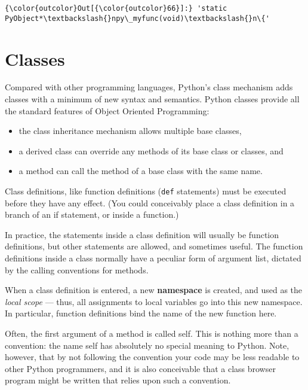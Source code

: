 \documentclass{article}
\begin{document}
            \begin{Verbatim}[commandchars=\\\{\}]
{\color{outcolor}Out[{\color{outcolor}66}]:} 'static PyObject*\textbackslash{}npy\_myfunc(void)\textbackslash{}n\{'
\end{Verbatim}
        
    \section{Classes}\label{classes}

Compared with other programming languages, Python's class mechanism adds
classes with a minimum of new syntax and semantics. Python classes
provide all the standard features of Object Oriented Programming:

\begin{itemize}
\itemsep1pt\parskip0pt
\item
  the class inheritance mechanism allows multiple base classes,
\item
  a derived class can override any methods of its base class or classes,
  and
\item
  a method can call the method of a base class with the same name.
\end{itemize}

Class definitions, like function definitions (\texttt{def} statements)
must be executed before they have any effect. (You could conceivably
place a class definition in a branch of an if statement, or inside a
function.)

In practice, the statements inside a class definition will usually be
function definitions, but other statements are allowed, and sometimes
useful. The function definitions inside a class normally have a peculiar
form of argument list, dictated by the calling conventions for methods.

When a class definition is entered, a new \textbf{namespace} is created,
and used as the \emph{local scope} --- thus, all assignments to local
variables go into this new namespace. In particular, function
definitions bind the name of the new function here.

Often, the first argument of a method is called self. This is nothing
more than a convention: the name self has absolutely no special meaning
to Python. Note, however, that by not following the convention your code
may be less readable to other Python programmers, and it is also
conceivable that a class browser program might be written that relies
upon such a convention.
\end{document}
